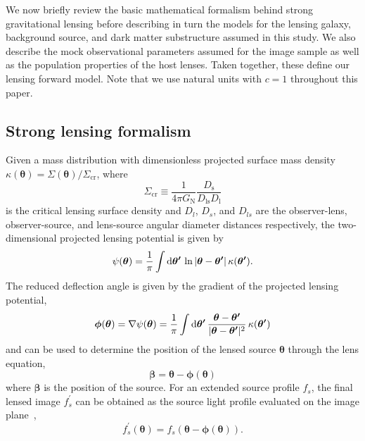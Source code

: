 \documentclass[twocolumn]{aastex63}
\begin{document}
We now briefly review the basic mathematical formalism behind strong gravitational lensing before describing in turn the models for the lensing galaxy, background source, and dark matter substructure assumed in this study. We also describe the mock observational parameters assumed for the image sample as well as the population properties of the host lenses. Taken together, these define our lensing forward model. Note that we use natural units with $c=1$ throughout this paper.

\subsection{Strong lensing formalism}

Given a mass distribution with dimensionless projected surface mass density $\kappa(\boldsymbol{\theta})=\Sigma(\boldsymbol{\theta}) / \Sigma_{\mathrm{cr}}$, where 
\begin{equation}
\Sigma_{\mathrm{cr}}\equiv \frac{1}{4 \pi G_\mathrm{N}} \frac{D_{\mathrm{s}}}{D_{\mathrm{ls}} D_{\mathrm{l}}}
\end{equation}
is the critical lensing surface density and $D_{l}$, $D_{ s}$, and $D_{{ls}}$ are the observer-lens, observer-source, and lens-source angular diameter distances respectively, the two-dimensional projected lensing potential is given by~\citep[\eg,][]{1992grle.book.....S,astro-ph/9912508}
\begin{equation}
\psi(\boldsymbol{\theta})=\frac{1}{\pi} \int \diff \boldsymbol{\theta^\prime}\,\ln |\boldsymbol{\theta}-\boldsymbol{\theta^\prime}|\,\kappa(\boldsymbol{\theta^\prime}) .
\end{equation}
The reduced deflection angle is given by the gradient of the projected lensing potential,
\begin{equation}
\boldsymbol{\phi}(\boldsymbol{\theta}) = \nabla \psi(\boldsymbol{\theta}) = \frac{1}{\pi} \int \diff \boldsymbol{\theta^\prime}\,\frac{\boldsymbol{\theta}-\boldsymbol{\theta^\prime}}{|\boldsymbol{\theta}-\boldsymbol{\theta^\prime}|^2}\,\kappa(\boldsymbol{\theta^\prime})
\label{eq:deflection}
\end{equation}
and can be used to determine the position of the lensed source $\boldsymbol{\theta}$ through the lens equation,
\begin{equation}
\boldsymbol{\beta}=\boldsymbol{\theta}-\boldsymbol{\phi}(\boldsymbol{\theta})
\end{equation}
where $\boldsymbol{\beta}$ is the position of the source. For an extended source profile $f_s$, the final lensed image $f^\prime_s$ can be obtained as the source light profile evaluated on the image plane~\citep[\eg,][]{1706.06111},
\begin{equation}
f^\prime_s(\boldsymbol{\theta}) = f_s\left(\boldsymbol{\theta}-\boldsymbol{\phi}(\boldsymbol{\theta})\right).
\label{eq:lensed_image}
\end{equation}
\end{document}

